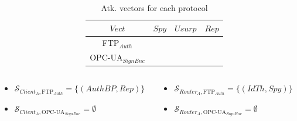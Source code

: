 \documentclass{beamer}
\newcommand{\cmark}{{\color{green}\ding{51}}}%
\newcommand{\xmark}{}%
\newcommand{\ftpauth}{FTP$_{Auth}$\xspace}
\newcommand{\opcuasignenc}{OPC-UA$_{SignEnc}$\xspace}
\begin{document}
\begin{frame}
\begin{columns}[c]
\begin{column}{.45\textwidth}
        \end{column}
        \begin{column}{.55\textwidth}
            \begin{table}[htb]
                \centering
                \begin{tabular}{|c|c|c|c|}
                    \hline
                    $Vect$          & $Spy$     & $Usurp$   & $Rep$     \\
                    \hline
                    \ftpauth        & \cmark    & \xmark    & \cmark    \\
                    \hline
                    \opcuasignenc   & \xmark    & \xmark    & \xmark    \\
                    \hline
                \end{tabular}
                \caption{Atk. vectors for each protocol}
                \label{tab:ex_cap}
            \end{table}
        \end{column}
    \end{columns}
    \begin{columns}[c]
        \begin{column}{.55\textwidth}
            \begin{itemize}
                \item $\mathcal{S}_{Client_{A},\text{\ftpauth}} = \{ (AuthBP, Rep) \}$
                \item $\mathcal{S}_{Client_{A},\text{\opcuasignenc}} = \emptyset$
            \end{itemize}
        \end{column}
        \hspace{-1em}
        \begin{column}{.5\textwidth}
            \begin{itemize}
                \item $\mathcal{S}_{Router_{A},\text{\ftpauth}} = \{ (IdTh, Spy) \}$
                \item $\mathcal{S}_{Router_{A},\text{\opcuasignenc}} = \emptyset$
            \end{itemize}
        \end{column}
    \end{columns}
\end{frame}
\end{document}
